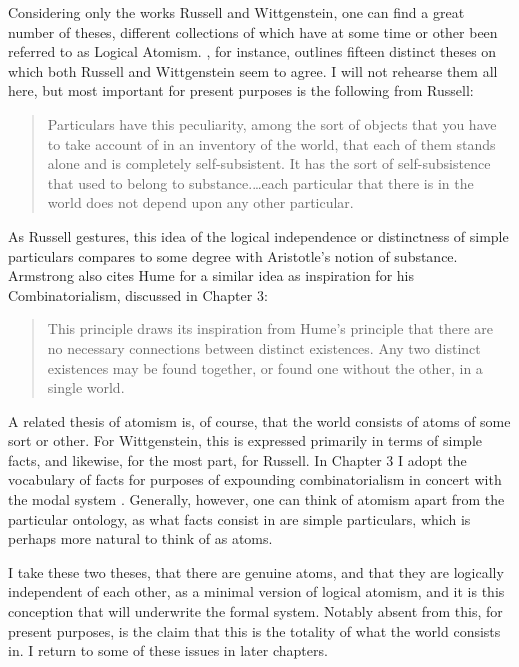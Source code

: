 Considering only the works Russell and Wittgenstein, one can find a great number of theses, different collections of which have at some time or other been referred to as Logical Atomism. \cite{Bradley:92}, for instance, outlines fifteen distinct theses on which both Russell and Wittgenstein seem to agree. I will not rehearse them all here, but most important for present purposes is the following from Russell:

\begin{quote}
Particulars have this peculiarity, among the sort of objects that you have to take account of in an inventory of the world, that each of them stands alone and is completely self-subsistent. It has the sort of self-subsistence that used to belong to substance.\dots each particular that there is in the world does not depend upon any other particular. \citeyear[p.202]{Russell:18}
\end{quote}

\noindent As Russell gestures, this idea of the logical independence or distinctness of simple particulars compares to some degree with Aristotle's notion of substance. Armstrong also cites Hume for a similar idea as inspiration for his Combinatorialism, discussed in Chapter 3:

\begin{quote}
This principle draws its inspiration from Hume's principle that there are no necessary connections between distinct existences. Any two distinct existences may be found together, or found one without the other, in a single world. \citeyear[p. 20]{Armstrong:89}
\end{quote}

\noindent A related thesis of atomism is, of course, that the world consists of atoms of some sort or other. For Wittgenstein, this is expressed primarily in terms of simple facts, and likewise, for the most part, for Russell. In Chapter 3 I adopt the vocabulary of facts for purposes of expounding combinatorialism in concert with the modal system \GoModal. Generally, however, one can think of atomism apart from the particular ontology, as what facts consist in are simple particulars, which is perhaps more natural to think of as atoms. 

I take these two theses, that there are genuine atoms, and that they are logically independent of each other, as a minimal version of logical atomism, and it is this conception that will underwrite the formal system. Notably absent from this, for present purposes, is the claim that this is the totality of what the world consists in. I return to some of these issues in later chapters.


